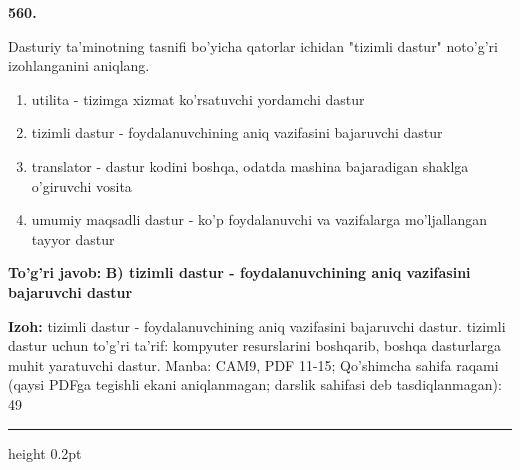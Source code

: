 \documentclass[10pt,a4paper]{article}
\begin{document}
{\bfseries\sffamily\color{ink} 560.}
\par
Dasturiy ta'minotning tasnifi bo'yicha qatorlar ichidan "tizimli dastur" noto'g'ri izohlanganini aniqlang.
\begin{enumerate}[label=\Alph*),leftmargin=9mm]
\item utilita - tizimga xizmat ko'rsatuvchi yordamchi dastur
\item tizimli dastur - foydalanuvchining aniq vazifasini bajaruvchi dastur
\item translator - dastur kodini boshqa, odatda mashina bajaradigan shaklga o'giruvchi vosita
\item umumiy maqsadli dastur - ko'p foydalanuvchi va vazifalarga mo'ljallangan tayyor dastur
\end{enumerate}
\begin{tcolorbox}[enhanced,breakable,colback=teal!4,colframe=teal!60!black,boxrule=0.45pt,arc=1.2mm,left=2.7mm,right=2.7mm,top=1.8mm,bottom=1.8mm,before skip=2mm,after skip=2mm]
{\bfseries\sffamily\color{teal}To'g'ri javob:} \textbf{B) tizimli dastur - foydalanuvchining aniq vazifasini bajaruvchi dastur}
\par\smallskip
{\bfseries Izoh:} tizimli dastur - foydalanuvchining aniq vazifasini bajaruvchi dastur. tizimli dastur uchun to'g'ri ta'rif: kompyuter resurslarini boshqarib, boshqa dasturlarga muhit yaratuvchi dastur. Manba: CAM9, PDF 11-15; Qo'shimcha sahifa raqami (qaysi PDFga tegishli ekani aniqlanmagan; darslik sahifasi deb tasdiqlanmagan): 49
\end{tcolorbox}
\vspace{2mm}\hrule height 0.2pt\vspace{3mm}
\end{document}
